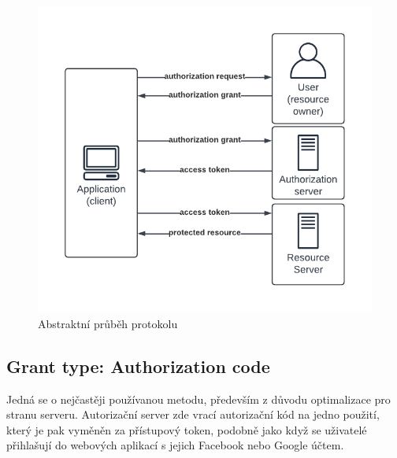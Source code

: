 \begin{figure}[ht!]
    \centering
    \includegraphics[width=\textwidth]{figures/OAuth_abstract_flow.pdf}
    \caption{Abstraktní průběh protokolu}%
    \label{fig:Oauth_roles_diagram}
\end{figure}


\subsection{Grant type: Authorization code}
Jedná se o nejčastěji používanou metodu, především z důvodu optimalizace pro stranu serveru. Autorizační server zde vrací autorizační kód na jedno použití, který je pak vyměněn za přístupový token, podobně jako když se uživatelé přihlašují do webových aplikací s jejich Facebook nebo Google účtem.

